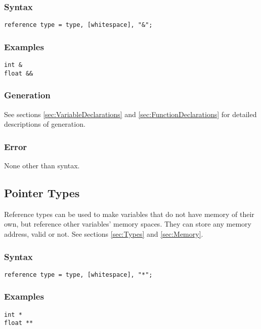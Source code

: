\documentclass[10pt,a4paper]{article}
\begin{document}
\subsubsection{Syntax}
\begin{verbatim}
reference type = type, [whitespace], "&";
\end{verbatim}

\subsubsection{Examples}
\begin{verbatim}
int &
float &&
\end{verbatim}

\subsubsection{Generation}
See sections \ref{sec:VariableDeclarations} and \ref{sec:FunctionDeclarations} for detailed descriptions of generation.

\subsubsection{Error}
None other than syntax.

\newpage





\subsection{Pointer Types}
\label{sec:AtomicTypes}
Reference types can be used to make variables that do not have memory of their own, but reference other variables' memory spaces. They can store any memory address, valid or not. See sections \ref{sec:Types} and \ref{sec:Memory}.

\subsubsection{Syntax}
\begin{verbatim}
reference type = type, [whitespace], "*";
\end{verbatim}

\subsubsection{Examples}
\begin{verbatim}
int *
float **
\end{verbatim}
\end{document}
